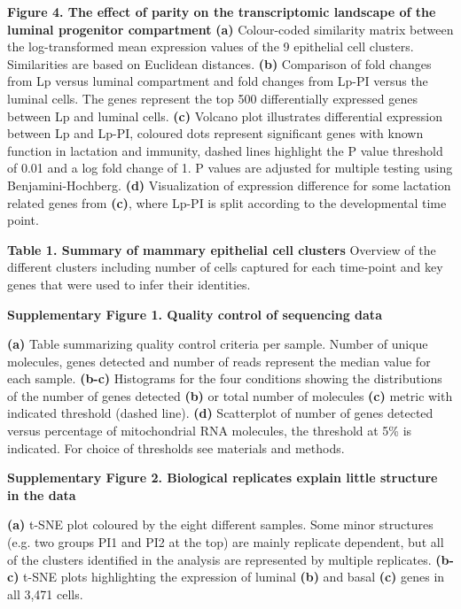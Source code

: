 \documentclass[titlepage, 12pt, oneside]{amsart}
\newcommand{\fakefigure}[1]%
{\refstepcounter{figure}\label{#1}}
\begin{document}
\textbf{Figure 4. The effect of parity on the transcriptomic landscape
of the luminal progenitor compartment}
\fakefigure{F4}
\textbf{(a)} Colour-coded similarity matrix between the log-transformed mean expression values of the 9 epithelial cell clusters.
Similarities are based on Euclidean distances.
\textbf{(b)} Comparison of fold changes from Lp versus luminal compartment and fold changes from Lp-PI versus the luminal cells.
The genes represent the top 500 differentially expressed genes between Lp and luminal cells.
\textbf{(c)} Volcano plot illustrates differential expression between Lp and Lp-PI, coloured dots represent significant genes with known function in lactation and immunity, dashed lines highlight the P value threshold of 0.01 and a log fold change of 1.
P values are adjusted for multiple testing using Benjamini-Hochberg.
\textbf{(d)} Visualization of expression difference for some lactation related genes from \textbf{(c)}, where Lp-PI is split according to the developmental time point.

\textbf{Table 1. Summary of mammary epithelial cell clusters}
\fakefigure{T1}
Overview of the different clusters including number of cells captured for each time-point and key genes that were used to infer their identities.

\textbf{Supplementary Figure 1. Quality control of sequencing data}

\textbf{(a)} Table summarizing quality control criteria per sample.
Number of unique molecules, genes detected and number of reads represent the median value for each sample.
\textbf{(b-c)} Histograms for the four conditions showing the distributions of the number of genes detected \textbf{(b)} or total number of molecules \textbf{(c)} metric with indicated threshold (dashed line).
\textbf{(d)} Scatterplot of number of genes detected versus percentage of mitochondrial RNA molecules, the threshold at 5\% is indicated.
For choice of thresholds see materials and methods.

\textbf{Supplementary Figure 2. Biological replicates explain little
structure in the data }

\textbf{(a)} t-SNE plot coloured by the eight different samples. Some minor structures (e.g. two groups PI1 and PI2 at the top) are mainly replicate dependent, but all of the clusters identified in the analysis are represented by multiple replicates.
\textbf{(b-c)} t-SNE plots highlighting the expression of luminal \textbf{(b)} and basal \textbf{(c)} genes in all 3,471 cells.
\end{document}
